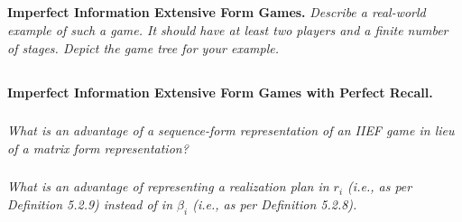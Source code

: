 \documentclass[12pt]{amsart}
\begin{document}
\subsection{}
\textbf{Imperfect Information Extensive Form Games.} 
\textit{Describe a real-world example of such a game. It should have at least two players 
	and a finite number of stages. Depict the game tree for your example.}



\subsection{}
\textbf{Imperfect Information Extensive Form Games with Perfect Recall.}

\subsubsection{}
\textit{What is an advantage of a sequence-form representation of an IIEF game in lieu of a
	matrix form representation?}

\subsubsection{}
\textit{What is an advantage of representing a realization plan in $r_i$ (i.e., as per Definition 5.2.9)
	instead of in $\beta_i$ (i.e., as per Definition 5.2.8).}
\end{document}

